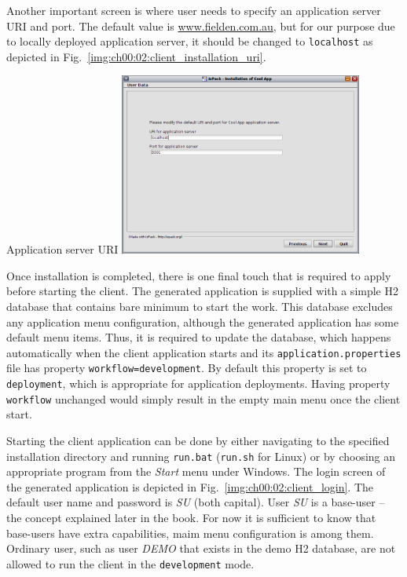   Another important screen is where user needs to specify an application server URI and port.
  The default value is \url{www.fielden.com.au}, but for our purpose due to locally deployed application server, it should be changed to \texttt{localhost} as depicted in Fig.~\ref{img:ch00:02:client_installation_uri}.

  \begin{image}{Application server URI}{\label{img:ch00:02:client_installation_uri}}    
    \includegraphics[width=0.6\textwidth]{parts/00-part/chapters/01-application-modules/images/03-client-installation-uri.png}
  \end{image}
  
  Once installation is completed, there is one final touch that is required to apply before starting the client.
  The generated application is supplied with a simple H2 database that contains bare minimum to start the work.
  This database excludes any application menu configuration, although the generated application has some default menu items.
  Thus, it is required to update the database, which happens automatically when the client application starts and its \texttt{application.properties} file has property \texttt{workflow=development}.
  By default this property is set to \texttt{deployment}, which is appropriate for application deployments.
  Having property \texttt{workflow} unchanged would simply result in the empty main menu once the client start.
  
  Starting the client application can be done by either navigating to the specified installation directory and running \texttt{run.bat} (\texttt{run.sh} for Linux) or by choosing an appropriate program from the \emph{Start} menu under Windows.
  The login screen of the generated application is depicted in Fig.~\ref{img:ch00:02:client_login}.
  The default user name and password is \emph{SU} (both capital).
  User \emph{SU} is a base-user -- the concept explained later in the book.
  For now it is sufficient to know that base-users have extra capabilities, maim menu configuration is among them.
  Ordinary user, such as user \emph{DEMO} that exists in the demo H2 database, are not allowed to run the client in the \texttt{development} mode.


